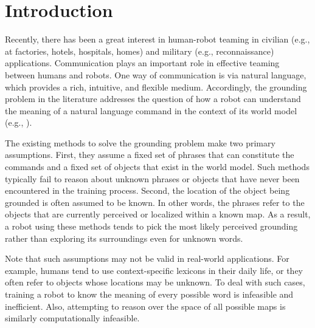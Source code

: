 \section{Introduction}
Recently, there has been a great interest in human-robot teaming in civilian (e.g., at factories, hotels, hospitals, homes) and military (e.g., reconnaissance) applications. Communication plays an important role in effective teaming between humans and robots. One way of communication is via natural language, which provides a rich, intuitive, and flexible medium. Accordingly, the grounding problem in the literature addresses the question of how a robot can understand the meaning of a natural language command in the context of its world model (e.g., \cite{g3,dcg,adcg2016}). 

The existing methods to solve the grounding problem make two primary assumptions. First, they assume a fixed set of phrases that can constitute the commands and a fixed set of objects that exist in the world model. Such methods typically fail to reason about unknown phrases or objects that have never been encountered in the training process.
Second, the location of the object being grounded is often assumed to be known. In other words, the phrases refer to the objects that are currently perceived or localized within a known map.
As a result, a robot using these methods tends to pick the most likely perceived grounding rather than exploring its surroundings even for unknown words.

Note that such assumptions may not be valid in real-world applications. For example, humans tend to use context-specific lexicons in their daily life, or they often refer to objects whose locations may be unknown. To deal with such cases, training a robot to know the meaning of every possible word is infeasible and inefficient. Also, attempting to reason over the space of all possible maps is similarly computationally infeasible.


